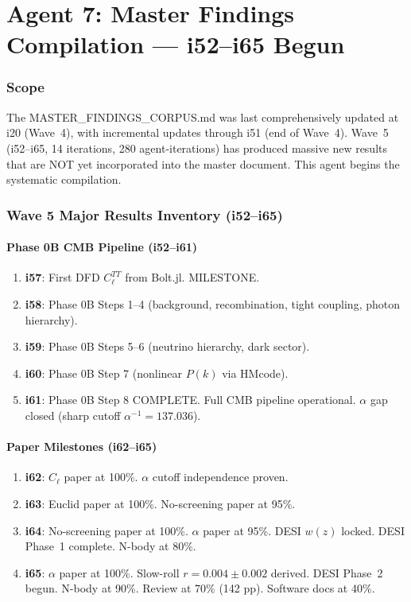 \documentclass[11pt,a4paper]{article}
\begin{document}
\part{Agent 7: Master Findings Compilation --- i52--i65 Begun}
\label{part:master-findings}

\section{Scope}

The MASTER\_FINDINGS\_CORPUS.md was last comprehensively updated at i20 (Wave~4), with incremental updates through i51 (end of Wave~4). Wave~5 (i52--i65, 14 iterations, 280 agent-iterations) has produced massive new results that are NOT yet incorporated into the master document. This agent begins the systematic compilation.

\section{Wave 5 Major Results Inventory (i52--i65)}

\subsection{Phase 0B CMB Pipeline (i52--i61)}

\begin{enumerate}
\item \textbf{i57}: First DFD $C_\ell^{TT}$ from Bolt.jl. MILESTONE.
\item \textbf{i58}: Phase 0B Steps 1--4 (background, recombination, tight coupling, photon hierarchy).
\item \textbf{i59}: Phase 0B Steps 5--6 (neutrino hierarchy, dark sector).
\item \textbf{i60}: Phase 0B Step 7 (nonlinear $P(k)$ via HMcode).
\item \textbf{i61}: Phase 0B Step 8 COMPLETE. Full CMB pipeline operational. $\alpha$ gap closed (sharp cutoff $\alpha^{-1} = 137.036$).
\end{enumerate}

\subsection{Paper Milestones (i62--i65)}

\begin{enumerate}
\item \textbf{i62}: $C_\ell$ paper at 100\%. $\alpha$ cutoff independence proven.
\item \textbf{i63}: Euclid paper at 100\%. No-screening paper at 95\%.
\item \textbf{i64}: No-screening paper at 100\%. $\alpha$ paper at 95\%. DESI $w(z)$ locked. DESI Phase~1 complete. N-body at 80\%.
\item \textbf{i65}: $\alpha$ paper at 100\%. Slow-roll $r = 0.004 \pm 0.002$ derived. DESI Phase~2 begun. N-body at 90\%. Review at 70\% (142 pp). Software docs at 40\%.
\end{enumerate}
\end{document}
